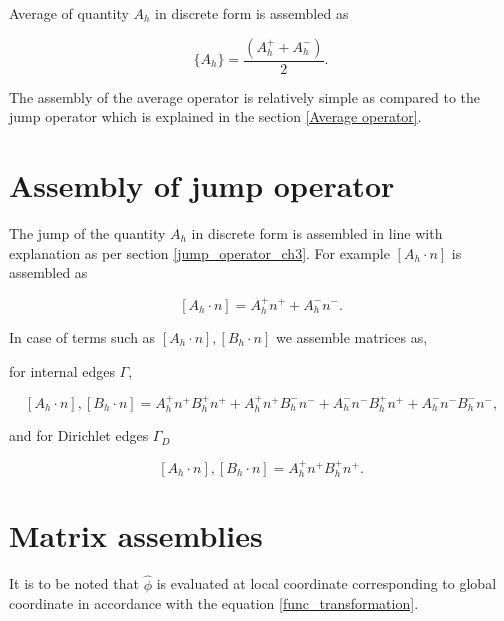 \documentclass[a4paper,twoside,openright]{book}
\begin{document}
Average of quantity $A_h$ in discrete form is assembled as

\begin{equation}\label{Average operator}
\lbrace A_h \rbrace = \frac{(A_h^+ + A_h^-)}{2} \textrm{.}
\end{equation}

The assembly of the average operator is relatively simple as compared to the jump operator which is explained in the section \ref{Average operator}.

\section{Assembly of jump operator} \label{Jump operator}

The jump of the quantity $A_h$ in discrete form is assembled in line with explanation as per section \ref{jump_operator_ch3}. For example $[A_h \cdot n]$ is assembled as

\begin{equation} \label{Jump_operator}
[A_h \cdot n] = A_h^+ n^+ + A_h^- n^- \textrm{.}
\end{equation}

In case of terms such as $[A_h \cdot n],[B_h \cdot n]$ we assemble matrices as, 

for internal edges $\Gamma$,

\begin{equation} \label{Jump operator L2}
[A_h \cdot n],[B_h \cdot n] = A_h^+ n^+ B_h^+ n^+ + A_h^+ n^+ B_h^- n^- + A_h^- n^- B_h^+ n^+ + A_h^- n^- B_h^- n^- \textrm{,}
\end{equation}

and for Dirichlet edges $\Gamma_D$

\begin{equation} \label{Jump operator L2 for dirichlet}
[A_h \cdot n],[B_h \cdot n] = A_h^+ n^+ B_h^+ n^+ \textrm{.}
\end{equation}


\section{Matrix assemblies} \label{matrix_assembly_ch4}

It is to be noted that $\hat{\phi}$ is evaluated at local coordinate corresponding to global coordinate in accordance with the equation \eqref{func_transformation}.
\end{document}
